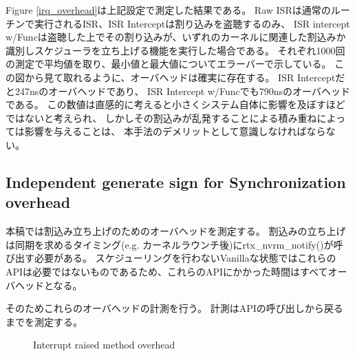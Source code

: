 Figure \ref{irq_overhead}は上記設定で測定した結果である。
Raw ISRは通常のルーチンで実行されるISR、ISR Interceptは割り込みを盗聴するのみ、
ISR intercept w/Funcは盗聴した上でその割り込みが、いずれのカーネルに関連した割込みか識別しスケジューラを立ち上げる機能を実行した場合である。
それぞれ1000回の測定で平均値を取り、最小値と最大値についてエラーバーで示している。
この図から見て取れるように、オーバヘッドは確実に存在する。
ISR Interceptだと247nsのオーバヘッドであり、
ISR Intercept w/Funcでも790nsのオーバヘッドである。
この数値は直感的に考えると小さくシステム自体に影響を及ぼすほどではないと考えられ、
しかしその割込みが乱発することによる積み重ねによっては影響を与えることは、
本手法のデメリットとして意識しなければならない。


\subsection{Independent generate sign for Synchronization overhead}

本稿では割込み立ち上げのためのオーバヘッドを測定する。
割込みの立ち上げは同期を求めるタイミング(e.g. カーネルラウンチ後)にrtx\_nvrm\_notify()が呼び出す必要がある。
スケジューリングを行わないVanillaな状態ではこれらのAPIは必要ではないものであるため、これらのAPIにかかった時間はすべてオーバヘッドとなる。

そのためこれらのオーバヘッドの計測を行う。
計測はAPIの呼び出しから戻るまでを測定する。

\begin{figure}[!t]
\begin{center}
\caption{Interrupt raised method overhead}
\label{fig:irq_rise_overhead}
\end{center}
\end{figure}

